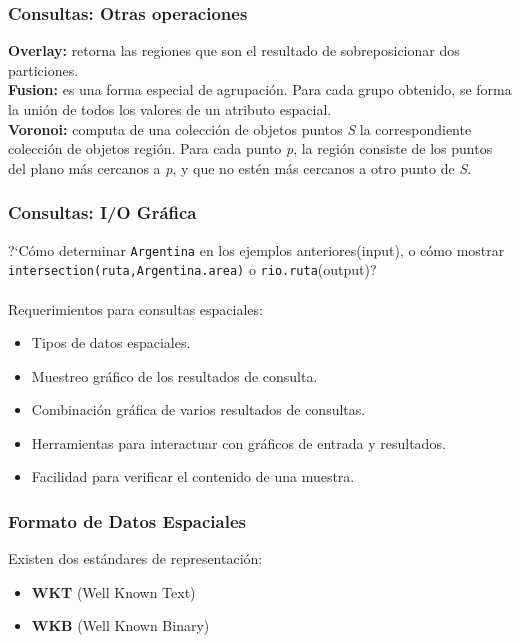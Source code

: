 \documentclass[a4paper,12pt,oneside]{report}
\begin{document}
\subsubsection*{Consultas: Otras operaciones}

\textbf{Overlay:} retorna las regiones que son el resultado de sobreposicionar dos particiones.\\
\textbf{Fusion:} es una forma especial de agrupaci\'on. Para cada grupo obtenido, se forma la uni\'on de todos los valores de un atributo espacial.\\
\textbf{Voronoi:} computa de una colecci\'on de objetos puntos \textit{S} la correspondiente colecci\'on de objetos regi\'on. Para cada punto \textit{p}, la regi\'on consiste de los puntos del plano m\'as cercanos a \textit{p}, y que no est\'en m\'as cercanos a otro punto de \textit{S}.  


\subsubsection*{Consultas: I/O Gr\'afica}
?`C\'omo determinar \texttt{Argentina} en los ejemplos anteriores(input), o c\'omo mostrar \texttt{intersection(ruta,Argentina.area)} o \texttt{rio.ruta}(output)?\\
\ \\
Requerimientos para consultas espaciales:
\begin{itemize}
\item Tipos de datos espaciales.
\item Muestreo gr\'afico de los resultados de consulta.
\item Combinaci\'on gr\'afica de varios resultados de consultas.
\item Herramientas para interactuar con gr\'aficos de entrada y resultados.
\item Facilidad para verificar el contenido de una muestra.
\end{itemize}

\subsubsection*{Formato de Datos Espaciales}
Existen dos est\'andares de representaci\'on:
\begin{itemize}
\item \textbf{WKT} (Well Known Text)
\item \textbf{WKB} (Well Known Binary)
\end{itemize}
\end{document}
